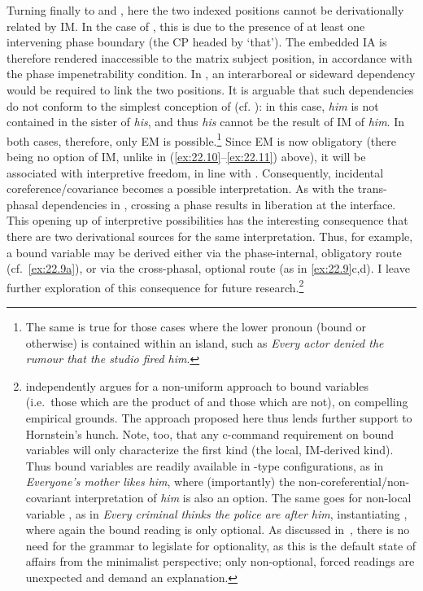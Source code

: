 \documentclass[output=paper]{langsci/langscibook}
\begin{document}
Turning finally to  and , here the two indexed
positions cannot be derivationally related by \gls{IM}. In the case of
, this is due to the presence of at least one intervening phase
boundary (the CP headed by \enquote*{that}). The embedded \gls{IA} is therefore rendered
inaccessible to the matrix subject position, in accordance with the phase
impenetrability condition. In , an interarboreal or sideward
dependency would be required to link the two positions. It is arguable that
such dependencies do not conform to the simplest conception of  (cf.
\citealt{Chomsky2007}): in this case, \emph{him} is not contained in the sister
of \emph{his}, and thus \emph{his} cannot be the result of \gls{IM} of
\emph{him}. In both cases, therefore, only \gls{EM} is possible.\footnote{The
    same is true for those cases where the lower pronoun (bound or otherwise)
    is contained within an island, such as \emph{Every actor
    denied the rumour that the studio fired him}.} Since
    \gls{EM} is now obligatory (there being no option of \gls{IM}, unlike in
    (\ref{ex:22.10}--\ref{ex:22.11}) above), it will be associated with interpretive
    freedom, in line with .  Consequently, incidental
    coreference/covariance becomes a possible interpretation. As with the
    trans-phasal dependencies in , crossing a phase results in
    liberation at the interface. This opening up of interpretive possibilities
    has the interesting consequence that there are two derivational sources for
    the same interpretation. Thus, for example, a bound variable may be derived
    either via the phase-internal, obligatory route (cf.\ \ref{ex:22.9a}), or
    via the cross-phasal, optional route (as in \ref{ex:22.9}c,d). I leave further
    exploration of this consequence for future
    research.\footnote{\citet{Hornstein2013} independently argues for a
        non-uniform approach to bound variables (i.e.\ those which are the
        product of  and those which are not), on compelling empirical
        grounds. The approach proposed here thus lends further support to
        Hornstein’s hunch. Note, too, that any c-command requirement on bound
        variables will only characterize the first kind (the local, IM-derived
        kind). Thus bound variables are readily available in
        -type configurations, as in \emph{Everyone’s
        mother likes him}, where (importantly) the
        non-coreferential/non-covariant interpretation of \emph{him} is also an
        option. The same goes for non-local variable , as in \emph{Every
        criminal thinks the police are after him},
        instantiating , where again the bound reading is only
        optional.  As discussed in~, there is no need for
    the grammar to legislate for optionality, as this is the default state of
affairs from the minimalist perspective; only non-optional, forced readings are
unexpected and demand an explanation.}
\end{document}
